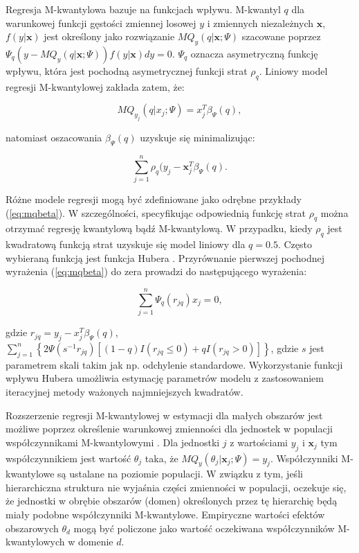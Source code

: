 Regresja M-kwantylowa bazuje na funkcjach wpływu. M-kwantyl $q$ dla warunkowej funkcji gęstości zmiennej losowej $y$ i zmiennych niezależnych $\boldsymbol{x}$, $f(y|\boldsymbol{x})$ jest określony jako rozwiązanie $MQ_y(q|\boldsymbol{x};\Psi)$ szacowane poprzez $\Psi_q(y-MQ_y(q|\boldsymbol{x}; \Psi))f(y|\boldsymbol{x})dy=0$. $\Psi_q$ oznacza asymetryczną funkcję wpływu, która jest pochodną asymetrycznej funkcji strat $\rho_q$. Liniowy model regresji M-kwantylowej zakłada zatem, że:

\begin{equation}
MQ_{y_j}(q|x_j; \Psi)=x_j^T\beta_\Psi(q),
\label{eq:mq}
\end{equation}

natomiast oszacowania $\beta_\Psi(q)$ uzyskuje się minimalizując:

\begin{equation}
\sum\limits_{j=1}^{n}{\rho_q(y_j-\boldsymbol{x}_j^T\beta_\Psi(q)}.
\label{eq:mqbeta}
\end{equation}

Różne modele regresji mogą być zdefiniowane jako odrębne przykłady (\ref{eq:mqbeta}). W szczególności, specyfikując odpowiednią funkcję strat $\rho_q$ można otrzymać regresję kwantylową bądź M-kwantylową. W przypadku, kiedy $\rho_q$ jest kwadratową funkcją strat uzyskuje się model liniowy dla $q=0.5$. Często wybieraną funkcją jest funkcja Hubera \citep{huber1981}. Przyrównanie pierwszej pochodnej wyrażenia (\ref{eq:mqbeta}) do zera prowadzi do następującego wyrażenia:

\begin{equation}
\sum\limits_{j=1}^{n}{\Psi_q(r_{jq})x_j}=0,
\end{equation}

gdzie $r_{jq}=y_j-x_j^T\beta_\Psi(q)$, $\sum\limits_{j=1}^{n}{\left\{2\Psi(s^{-1}r_{jq})\left[(1-q)I(r_{jq}\leq 0)+qI(r_{jq}> 0)\right]\right\}}$, gdzie $s$ jest parametrem skali takim jak np. odchylenie standardowe. Wykorzystanie funkcji wpływu Hubera umożliwia estymację parametrów modelu z zastosowaniem iteracyjnej metody ważonych najmniejszych kwadratów.


Rozszerzenie regresji M-kwantylowej w estymacji dla małych obszarów jest możliwe poprzez określenie warunkowej zmienności dla jednostek w populacji współczynnikami M-kwantylowymi \citep{mq2006}. Dla jednostki $j$ z wartościami $y_j$ i $\boldsymbol{x}_j$ tym współczynnikiem jest wartość $\theta_j$ taka, że $MQ_y(\theta_j|\boldsymbol{x}_j;\Psi)=y_j$. Współczynniki M-kwantylowe są ustalane na poziomie populacji. W związku z tym, jeśli hierarchiczna struktura nie wyjaśnia części zmienności w populacji, oczekuje się, że jednostki w obrębie obszarów (domen) określonych przez tę hierarchię będą miały podobne współczynniki M-kwantylowe. Empiryczne wartości efektów obszarowych $\theta_d$ mogą być policzone jako wartość oczekiwana współczynników M-kwantylowych w domenie $d$.

